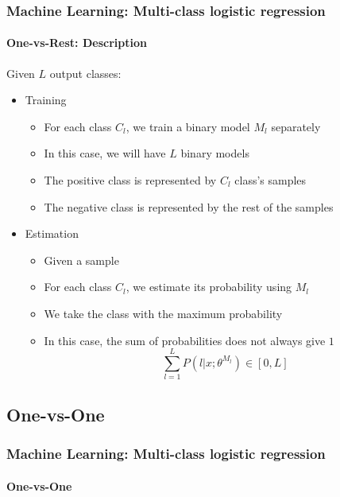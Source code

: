 \documentclass[xcolor=table]{beamer}
\begin{document}
\begin{frame}
	\frametitle{Machine Learning: Multi-class logistic regression}
	\framesubtitle{One-vs-Rest: Description}
	
	Given $L$ output classes:
	\begin{itemize}
		\item Training
		\begin{itemize}
			\item For each class $C_l$, we train a binary model $M_l$ separately
			\item In this case, we will have $L$ binary models
			\item The positive class is represented by $C_l$ class's samples
			\item The negative class is represented by the rest of the samples
		\end{itemize}
		\item Estimation
		\begin{itemize}
			\item Given a sample
			\item For each class $C_l$, we estimate its probability using $M_l$
			\item We take the class with the maximum probability
			\item In this case, the sum of probabilities does not always give $1$
			\[\sum_{l=1}^{L} P(l|x; \theta^{M_l}) \in [0, L]\]
		\end{itemize}
	\end{itemize}
	
\end{frame}

\subsection{One-vs-One}

\begin{frame}
	\frametitle{Machine Learning: Multi-class logistic regression}
	\framesubtitle{One-vs-One}
	
	
\end{frame}
\end{document}

